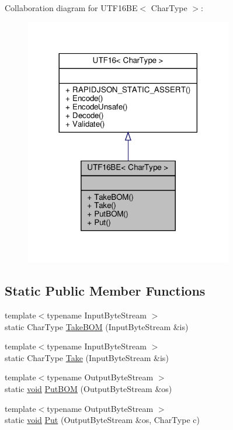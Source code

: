 Collaboration diagram for U\+T\+F16\+BE$<$ Char\+Type $>$\+:
\nopagebreak
\begin{figure}[H]
\begin{center}
\leavevmode
\includegraphics[width=257pt]{structUTF16BE__coll__graph}
\end{center}
\end{figure}
\subsection*{Static Public Member Functions}
\begin{DoxyCompactItemize}
\item 
{\footnotesize template$<$typename Input\+Byte\+Stream $>$ }\\static Char\+Type \hyperlink{structUTF16BE_a5d5184a373149c69b4b8baf8507f9591}{Take\+B\+OM} (Input\+Byte\+Stream \&is)
\item 
{\footnotesize template$<$typename Input\+Byte\+Stream $>$ }\\static Char\+Type \hyperlink{structUTF16BE_a671ca76d54f45aa5f62eb86c4e69738a}{Take} (Input\+Byte\+Stream \&is)
\item 
{\footnotesize template$<$typename Output\+Byte\+Stream $>$ }\\static \hyperlink{imgui__impl__opengl3__loader_8h_ac668e7cffd9e2e9cfee428b9b2f34fa7}{void} \hyperlink{structUTF16BE_ae109dda1ad7955049589885ea5a13652}{Put\+B\+OM} (Output\+Byte\+Stream \&os)
\item 
{\footnotesize template$<$typename Output\+Byte\+Stream $>$ }\\static \hyperlink{imgui__impl__opengl3__loader_8h_ac668e7cffd9e2e9cfee428b9b2f34fa7}{void} \hyperlink{structUTF16BE_ab0f964c3ec9ac6cc47f2875ae112dbfe}{Put} (Output\+Byte\+Stream \&os, Char\+Type c)
\end{DoxyCompactItemize}
